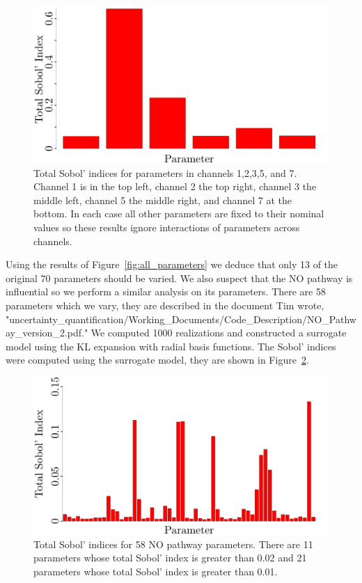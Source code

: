 \documentclass{article}
\begin{document}
\begin{figure}[h]
\begin{center}
\includegraphics[scale=.2]{Figures/Channel_7_Parameters.pdf}
\end{center}
\caption{Total Sobol' indices for parameters in channels 1,2,3,5, and 7. Channel 1 is in the top left, channel 2 the top right, channel 3 the middle left, channel 5 the middle right, and channel 7 at the bottom. In each case all other parameters are fixed to their nominal values so these results ignore interactions of parameters across channels.}
\label{fig:channelwise_sobol}
\end{figure}


\newpage

Using the results of Figure~\ref{fig:all_parameters} we deduce that only 13 of the original 70 parameters should be varied. We also suspect that the NO pathway is influential so we perform a similar analysis on its parameters. There are 58 parameters which we vary, they are described in the document Tim wrote, "uncertainty\_quantification/Working\_Documents/Code\_Description/NO\_Pathway\_version\_2.pdf." We computed 1000 realizations and constructed a surrogate model using the KL expansion with radial basis functions. The Sobol' indices were computed using the surrogate model, they are shown in Figure~\ref{fig:NO_pathway_all_parameters}.

\begin{figure}[h]
\begin{center}
\includegraphics[scale=.25]{Figures/NO_Pathway_All_Parameters.pdf}
\end{center}
\caption{Total Sobol' indices for 58 NO pathway parameters. There are 11 parameters whose total Sobol' index is greater than 0.02 and 21 parameters whose total Sobol' index is greater than 0.01.}
\label{fig:NO_pathway_all_parameters}
\end{figure}
\end{document}
